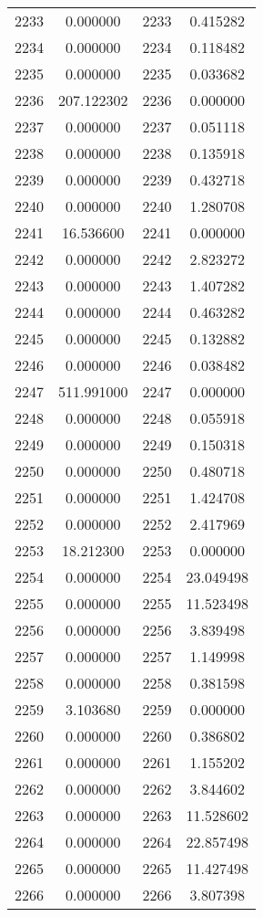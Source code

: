 \documentclass[12pt]{article}
\begin{document}
\begin{longtable}{@{}cccc@{}}
2233 & 0.000000 & 2233 & 0.415282 \\
2234 & 0.000000 & 2234 & 0.118482 \\
2235 & 0.000000 & 2235 & 0.033682 \\
2236 & 207.122302 & 2236 & 0.000000 \\
2237 & 0.000000 & 2237 & 0.051118 \\
2238 & 0.000000 & 2238 & 0.135918 \\
2239 & 0.000000 & 2239 & 0.432718 \\
2240 & 0.000000 & 2240 & 1.280708 \\
2241 & 16.536600 & 2241 & 0.000000 \\
2242 & 0.000000 & 2242 & 2.823272 \\
2243 & 0.000000 & 2243 & 1.407282 \\
2244 & 0.000000 & 2244 & 0.463282 \\
2245 & 0.000000 & 2245 & 0.132882 \\
2246 & 0.000000 & 2246 & 0.038482 \\
2247 & 511.991000 & 2247 & 0.000000 \\
2248 & 0.000000 & 2248 & 0.055918 \\
2249 & 0.000000 & 2249 & 0.150318 \\
2250 & 0.000000 & 2250 & 0.480718 \\
2251 & 0.000000 & 2251 & 1.424708 \\
2252 & 0.000000 & 2252 & 2.417969 \\
2253 & 18.212300 & 2253 & 0.000000 \\
2254 & 0.000000 & 2254 & 23.049498 \\
2255 & 0.000000 & 2255 & 11.523498 \\
2256 & 0.000000 & 2256 & 3.839498 \\
2257 & 0.000000 & 2257 & 1.149998 \\
2258 & 0.000000 & 2258 & 0.381598 \\
2259 & 3.103680 & 2259 & 0.000000 \\
2260 & 0.000000 & 2260 & 0.386802 \\
2261 & 0.000000 & 2261 & 1.155202 \\
2262 & 0.000000 & 2262 & 3.844602 \\
2263 & 0.000000 & 2263 & 11.528602 \\
2264 & 0.000000 & 2264 & 22.857498 \\
2265 & 0.000000 & 2265 & 11.427498 \\
2266 & 0.000000 & 2266 & 3.807398 \\

\end{longtable}
\end{document}
